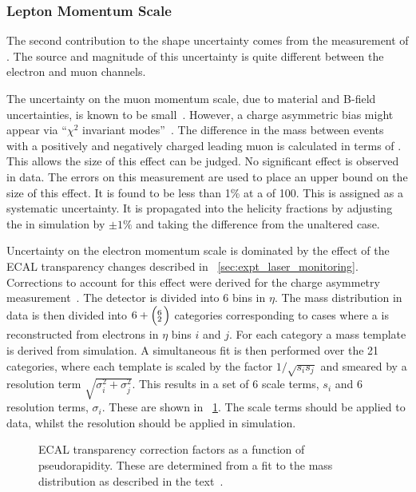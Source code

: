 \subsubsection{Lepton Momentum Scale}
The second contribution to the \LP shape uncertainty comes from the measurement
of \Ptl. The source and magnitude of this uncertainty is quite different between
the electron and muon channels.

The uncertainty on the muon momentum scale, due to material and B-field
uncertainties, is known to be small~\cite{mu_align_pas}. However, a charge
asymmetric \Pt bias might appear via ``$\chi^2$ invariant modes''~\cite[section
2.4]{matthias_edelhoff_thesis}. The difference in the \PZ mass between events
with a positively and negatively charged leading muon is calculated in terms of
\Ptl. This allows the size of this effect can be judged. No significant effect
is observed in data. The errors on this measurement are used to place an upper
bound on the size of this effect. It is found to be less than 1\% at a \Ptmu of
\unit{100}{\GeV}. This is assigned as a systematic uncertainty. It is propagated
into the helicity fractions by adjusting the \Ptmu in simulation by $\pm 1\%$
and taking the difference from the unaltered case.

Uncertainty on the electron momentum scale is dominated by the effect of the
\ac{ECAL} transparency changes described in
\sec~\ref{sec:expt_laser_monitoring}. Corrections to account for this effect
were derived for the \PW charge asymmetry
measurement~\cite{w_charge_asymmetry}. The detector is divided into 6 bins in
$\eta$. The \Zee mass distribution in data is then divided into $6+\Bigl(\negthinspace\begin{smallmatrix}6\\2\end{smallmatrix}\Bigr)$
categories corresponding to cases where a \PZ is reconstructed from electrons in
$\eta$ bins $i$ and $j$.  For each category a mass template is derived from
simulation. A simultaneous fit is then performed over the 21 categories, where
each template is scaled by the factor $1/\sqrt{s_is_j}$ and smeared by a
resolution term $\sqrt{\sigma_i^2 + \sigma_j^2}$. This results in a set of 6
scale terms, $s_i$ and 6 resolution terms, $\sigma_i$. These are shown in
\fig~\ref{fig:wpol_ecal_transp_corr}.  The scale terms should be applied to
data, whilst the resolution should be applied in simulation.

\begin{figure}[h!]
  \centering
  \quad
  \quad
  \caption[\ac{ECAL} transparency correction factors as a function of
  pseudorapidity]{\ac{ECAL} transparency correction factors as a function of
    pseudorapidity. These are determined from a fit to the \PZ mass distribution
    as described in the text~\cite{w_charge_asymmetry_an}.}
\label{fig:wpol_ecal_transp_corr}
\end{figure}

